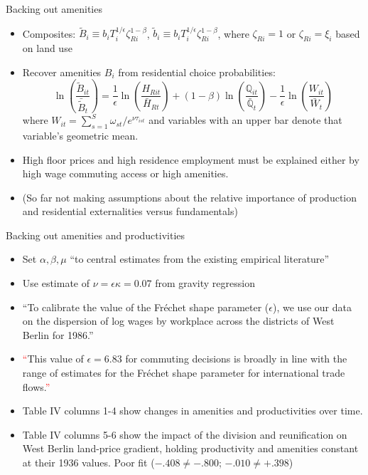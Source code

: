 \documentclass[11pt,notes=hide,aspectratio=169]{beamer}
\begin{document}
\begin{frame}{Backing out amenities}
\begin{itemize}
\item Composites:
$\tilde{B}_{i} \equiv b_i T_i^{1/\epsilon}\zeta_{Ri}^{1-\beta}$,
$\tilde{b}_{i} \equiv b_i T_i^{1/\epsilon}\zeta_{Ri}^{1-\beta}$,
where
$\zeta_{Ri} = 1$ or $\zeta_{Ri} = \xi_{i}$ based on land use
\item Recover amenities $B_{i}$ from residential choice probabilities:
\begin{equation*}
\ln\left(\frac{\tilde{B}_{it}}{\bar{\tilde{B}}_{t}} \right) = \frac{1}{\epsilon} \ln \left(\frac{H_{Rit}}{\bar{H}_{Rt}} \right) +  (1-\beta) \ln \left(\frac{\mathbb{Q}_{it}}{\bar{\mathbb{Q}}_t} \right)
- \frac{1}{\epsilon} \ln \left(\frac{W_{it}}{\bar{W}_t} \right)
\end{equation*}
where $W_{it} = \sum_{s=1}^{S} \omega_{st} / e^{\nu \tau_{ist}}$  and variables with an upper bar denote that variable's geometric mean.
\item High floor prices and high residence employment must be explained either by high wage commuting access or high amenities.  
\item (So far not making assumptions about the relative importance of production and residential externalities versus fundamentals) 
\end{itemize}
\end{frame}
\begin{frame}{Backing out amenities and productivities }
\begin{itemize}
\item Set $\alpha, \beta, \mu$ ``to central estimates from the existing empirical literature''
\item Use estimate of $\nu = \epsilon \kappa = 0.07$ from gravity regression
\item ``To calibrate the value of the Fréchet shape parameter ($\epsilon$), we use our data on the dispersion of log wages by workplace across the districts of West Berlin for 1986.''
\item \textcolor{red}{``}This value of $\epsilon = 6.83$ for commuting decisions is broadly in line with the range of estimates for the Fréchet shape parameter for international trade flows.\textcolor{red}{''}
\item Table IV columns 1-4 show changes in amenities and productivities over time.
\item Table IV columns 5-6 show the impact of the division and reunification on West Berlin land-price gradient, holding productivity and amenities constant at their 1936 values. Poor fit ($-.408 \neq -.800$; $-.010 \neq +.398$)
\end{itemize}
\end{frame}
\end{document}
